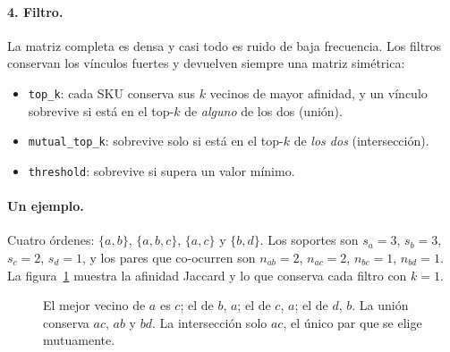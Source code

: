 \documentclass[11pt,a4paper,oneside]{report}
\newcommand{\code}[1]{\texttt{\small #1}}
\begin{document}
\paragraph{4. Filtro.} La matriz completa es densa y casi todo es ruido de baja frecuencia.
Los filtros conservan los vínculos fuertes y devuelven siempre una matriz simétrica:
\begin{itemize}
  \item \code{top\_k}: cada SKU conserva sus $k$ vecinos de mayor afinidad, y un vínculo
        sobrevive si está en el top-$k$ de \emph{alguno} de los dos (unión).
  \item \code{mutual\_top\_k}: sobrevive solo si está en el top-$k$ de \emph{los dos}
        (intersección).
  \item \code{threshold}: sobrevive si supera un valor mínimo.
\end{itemize}

\paragraph{Un ejemplo.} Cuatro órdenes: $\{a,b\}$, $\{a,b,c\}$, $\{a,c\}$ y $\{b,d\}$. Los
soportes son $s_a = 3$, $s_b = 3$, $s_c = 2$, $s_d = 1$, y los pares que co-ocurren son
$n_{ab} = 2$, $n_{ac} = 2$, $n_{bc} = 1$, $n_{bd} = 1$. La figura~\ref{fig:filtros} muestra
la afinidad Jaccard y lo que conserva cada filtro con $k = 1$.

\begin{figure}[ht]
\centering
{}
\caption{El mejor vecino de $a$ es $c$; el de $b$, $a$; el de $c$, $a$; el de $d$, $b$. La
unión conserva $ac$, $ab$ y $bd$. La intersección solo $ac$, el único par que se elige
mutuamente.}
\label{fig:filtros}
\end{figure}
\end{document}
